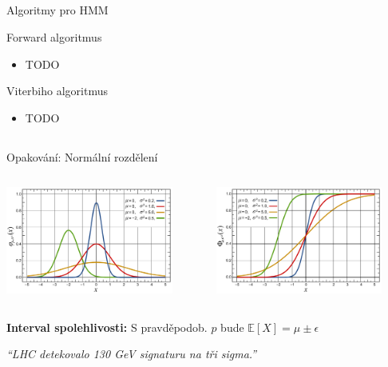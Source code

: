 \documentclass{beamer}
\begin{document}
\subsection{}
\begin{frame}{Algoritmy pro HMM}
\begin{block}{Forward algoritmus}
\begin{itemize}
\item TODO
\end{itemize}
\end{block}
\begin{block}{Viterbiho algoritmus}
\begin{itemize}
\item TODO
\end{itemize}
\end{block}
\end{frame}

\subsection{}
\begin{frame}{Opakování: Normální rozdělení}
\begin{columns}
	\begin{column}{5.5cm}
		\includegraphics[width=5.5cm]{Normal_Distribution_PDF.pdf}
	\end{column}
	\begin{column}{5.5cm}
		\includegraphics[width=5.5cm]{Normal_Distribution_CDF.pdf}
	\end{column}
\end{columns}

\begin{center}
{\bf Interval spolehlivosti:} S pravděpodob. $p$ bude $\mathbb{E}[X] = \mu \pm \epsilon$

{\em ``LHC detekovalo 130 GeV signaturu na tři sigma.''}
\end{center}
\end{frame}
\end{document}
